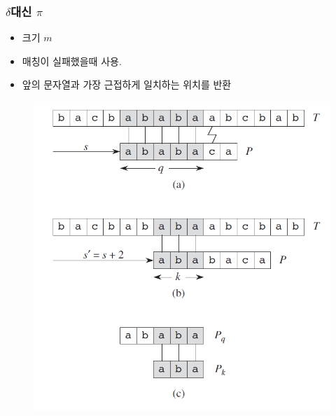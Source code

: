 \documentclass[10pt]{beamer}
\begin{document}
\begin{frame}
    \frametitle{$\delta$대신 $\pi$}
    \begin{itemize}
        \item 크기 $m$
        \item 매칭이 실패했을때 사용.
        \item 앞의 문자열과 가장 근접하게 일치하는 위치를 반환
    \end{itemize}
\end{frame}



\begin{frame}
    \begin{figure}[h!]
        \centering
        \includegraphics[scale=0.4]{pic3.PNG}
    \end{figure}
\end{frame}
\end{document}
